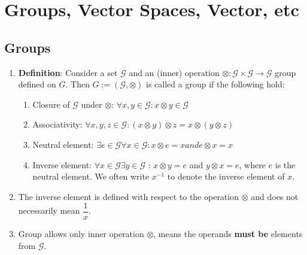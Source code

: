 \chapter{Groups, Vector Spaces, Vector, etc}




\section{Groups}

\begin{enumerate}
    \item \textbf{Definition}: Consider a set $\mathcal{G}$ and an (inner) operation $\otimes : \mathcal{G} \times \mathcal{G} \to \mathcal{G}$ group defined on $G$. Then $G := (\mathcal{G}, \otimes)$ is called a group if the following hold:
    \hfill \cite{mfml/book/mml/Deisenroth-Faisal-Ong}
    \begin{enumerate}
        \item Closure of $\mathcal{G}$ under $\otimes$: $\forall x, y \in \mathcal{G} : x \otimes y \in \mathcal{G}$
        \hfill \cite{mfml/book/mml/Deisenroth-Faisal-Ong}

        \item Associativity: $\forall x, y, z \in  \mathcal{G} : (x \otimes  y) \otimes  z = x \otimes  (y \otimes  z)$
        \hfill \cite{mfml/book/mml/Deisenroth-Faisal-Ong}

        \item Neutral element: $\exists e \in  \mathcal{G} \forall x \in  \mathcal{G} : x \otimes  e = x and e \otimes  x = x$
        \hfill \cite{mfml/book/mml/Deisenroth-Faisal-Ong}

        \item Inverse element: $\forall x \in  \mathcal{G} \exists y \in  \mathcal{G}$ : $x \otimes  y = e$ and $y \otimes  x = e$, where $e$ is the neutral element. We often write $x^{-1}$ to denote the inverse element of $x$.
        \hfill \cite{mfml/book/mml/Deisenroth-Faisal-Ong}
    \end{enumerate}

    \item The inverse element is defined with respect to the operation $\otimes$ and does not necessarily mean $\dfrac{1}{x}$.
    \hfill \cite{mfml/book/mml/Deisenroth-Faisal-Ong}

    \item Group allows only inner operation $\otimes$, means the operands \textbf{must be} elements from $\mathcal{G}$.


\end{enumerate}
